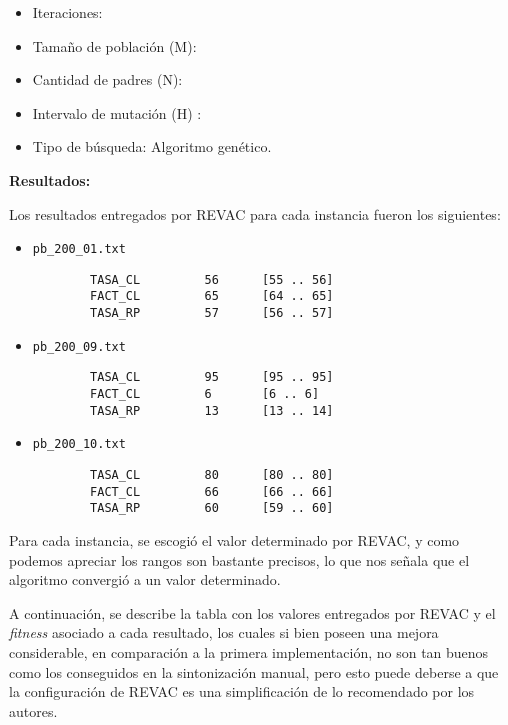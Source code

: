 \begin{itemize}
	\item Iteraciones: 
	\item Tamaño de población (M): 
	\item Cantidad de padres (N): 
	\item Intervalo de mutación (H) : 
	\item Tipo de búsqueda: Algoritmo genético.
\end{itemize}

\textbf{Resultados:}

Los resultados entregados por REVAC para cada instancia fueron los siguientes:

\begin{itemize}
	\item \texttt{pb\_200\_01.txt}\\

		\begin{verbatim}
        TASA_CL         56      [55 .. 56]
        FACT_CL         65      [64 .. 65]
        TASA_RP         57      [56 .. 57]
		\end{verbatim}
	\item \texttt{pb\_200\_09.txt}\\

		\begin{verbatim}
        TASA_CL         95      [95 .. 95]
        FACT_CL         6       [6 .. 6]
        TASA_RP         13      [13 .. 14]
		\end{verbatim}

	\item \texttt{pb\_200\_10.txt}\\

		\begin{verbatim}
        TASA_CL         80      [80 .. 80]
        FACT_CL         66      [66 .. 66]
        TASA_RP         60      [59 .. 60]
		\end{verbatim}

\end{itemize}

Para cada instancia, se escogió el valor determinado por REVAC,
y como podemos apreciar los rangos son bastante precisos, lo que nos señala
que el algoritmo convergió a un valor determinado.

A continuación, se describe la tabla con los valores entregados
por REVAC y el \emph{fitness} asociado a cada resultado, los cuales
si bien poseen una mejora considerable, en comparación a la primera implementación,
no son tan buenos como los conseguidos en la sintonización manual,
pero esto puede deberse a que la configuración de REVAC es una simplificación de
lo recomendado por los autores.

